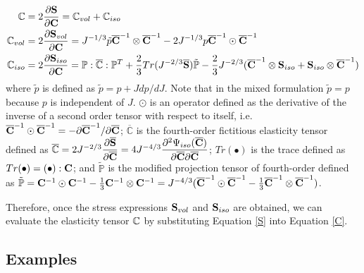 \begin{subequations} 
\label{C}
\begin{align}
\mathbb{C} &= 2\frac{\partial{\bold{S}}}{\partial{\bold{C}}} = \mathbb{C}_{vol} + \mathbb{C}_{iso} 
\label{Ctotal} \\
\mathbb{C}_{vol} &= 2\frac{\partial{\bold{S}_{vol}}}{\partial{\bold{C}}} =
J^{-1/3}\tilde{p}{\overline{\bold{C}}}^{-1}\otimes {\overline{\bold{C}}}^{-1} - 2J^{-1/3}p{\overline{\bold{C}}}^{-1}\odot {\overline{\bold{C}}}^{-1}  \label{Cvol} \\
\mathbb{C}_{iso} &= 2\frac{\partial{\bold{S}_{iso}}}{\partial{\bold{C}}} =
\mathbb{P} : \overline{\mathbb{C}} : \mathbb{P}^T + \frac{2}{3}Tr(J^{-2/3}\overline{\bold{S}})\tilde{\mathbb{P}} - \frac{2}{3}J^{-2/3}(\overline{\bold{C}}^{-1}\otimes\bold{S}_{iso} + \bold{S}_{iso}\otimes {\overline{\bold{C}}}^{-1})
\label{Ciso} 
\end{align}
\end{subequations}
where $\tilde{p}$ is defined as $\tilde{p} = p + J{dp}/{dJ}$. Note that in the mixed formulation $\tilde{p} = p$ because $p$ is independent of $J$. $\odot$ is an operator defined as the derivative of the inverse of a second order tensor with respect to itself, i.e. 
${\overline{\bold{C}}}^{-1}\odot {\overline{\bold{C}}}^{-1} = - {\partial{{\overline{\bold{C}}}^{-1}}} / {\partial{{\overline{\bold{C}}}}}$; 
$\overline{\mathbb{C}}$ is the fourth-order fictitious elasticity tensor defined as 
$\overline{\mathbb{C}} = 2J^{-2/3}\dfrac{\partial{\overline{\bold{S}}}}{\partial{\overline{\bold{C}}}} = 4J^{-4/3} \dfrac{\partial^2\Psi_{iso}(\overline{\bold{C}})} {\partial{\overline{\bold{C}}}{\partial{\overline{\bold{C}}}}} $;
$Tr(\bullet)$ is the trace defined as $Tr(\bullet) = (\bullet) : \bold{C}$;
and $\tilde{\mathbb{P}}$ is the modified projection tensor of fourth-order defined as 
$\tilde{\mathbb{P}} = \bold{C}^{-1} \odot \bold{C}^{-1} -  \frac{1}{3}\bold{C}^{-1} \otimes \bold{C}^{-1} = J^{-4/3}(
{\overline{\bold{C}}}^{-1} \odot {\overline{\bold{C}}}^{-1} -  \frac{1}{3} {\overline{\bold{C}}}^{-1} \otimes {\overline{\bold{C}}}^{-1})$.

Therefore, once the stress expressions $\bold{S}_{vol}$ and $\bold{S}_{iso}$ are obtained, we can evaluate the elasticity tensor $\mathbb{C}$ by substituting Equation \ref{S} into Equation \ref{C}.

%
\subsection {Examples}
